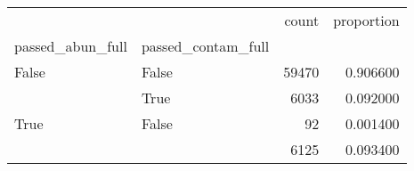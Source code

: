 \begin{tabular}{llrr}
\toprule
 &  & count & proportion \\
passed_abun_full & passed_contam_full &  &  \\
\midrule
False & False & 59470 & 0.906600 \\
\cline{1-4}
\multirow[t]{3}{*}{True} & True & 6033 & 0.092000 \\
 & False & 92 & 0.001400 \\
 &  & 6125 & 0.093400 \\
\cline{1-4}
\bottomrule
\end{tabular}
